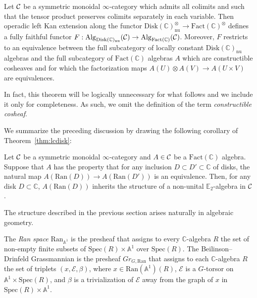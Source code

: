 \begin{thm}
Let $\operatorname{\mathcal{C}}$ be a symmetric monoidal $\infty$-category which admits all colimits and such that the tensor product preserves colimits separately in each variable.  Then operadic left Kan extension along the functor $\mathrm{Disk}(\mathbb{C})_{\mathrm{nu}}^\otimes \to \mathrm{Fact}(\mathbb{C})^\otimes$ defines a fully faithful functor $F: \operatorname{\mathrm{Alg}}_{\mathrm{Disk}(\mathbb{C})_{\mathrm{nu}}}(\operatorname{\mathcal{C}}) \to \operatorname{\mathrm{Alg}}_{\mathrm{Fact}(\mathbb{C})}(\operatorname{\mathcal{C}})$.  Moreover, $F$ restricts to an equivalence between the full subcategory of locally constant $\mathrm{Disk}(\mathbb{C})_{\mathrm{nu}}$ algebras and the full subcategory of $\mathrm{Fact}(\mathbb{C})$ algebras $A$ which are constructible cosheaves and for which the factorization maps $A(U)\otimes A(V) \to A(U\times V)$ are equivalences.  
\end{thm}

\begin{rmk}
In fact, this theorem will be logically unnecessary for what follows and we include it only for completeness.  As such, we omit the definition of the term \emph{constructible cosheaf}.  
\end{rmk}

We summarize the preceding discussion by drawing the following corollary of Theorem~\ref{thm:lcdisk}:
\begin{cor} \label{cor:E2crit}
Let $\operatorname{\mathcal{C}}$ be a symmetric monoidal $\infty$-category and $A \in \operatorname{\mathcal{C}}$ be a $\mathrm{Fact}(\mathbb{C})$ algebra.  Suppose that $A$ has the property that for any inclusion $D\subset D' \subset \mathbb{C}$ of disks, the natural map $A(\mathrm{Ran}(D))\to A(\mathrm{Ran}(D'))$ is an equivalence.  Then, for any disk $D\subset \mathbb{C}$, $A(\mathrm{Ran}(D))$ inherits the structure of a non-unital $\mathbb{E}_2$-algebra in $\operatorname{\mathcal{C}}$.  
\end{cor}


The structure described in the previous section arises naturally in algebraic geometry.  

\begin{dfn}
The \textit{Ran space} $\text{Ran}_{\mathbb{A}^1}$ is the presheaf that assigns to every $\mathbb{C}$-algebra $R$ the set of non-empty finite subsets of $\text{Spec}(R) \times \mathbb{A}^1$ over $\text{Spec}(R)$.   The Beilinson--Drinfeld Grassmannian is the presheaf $Gr_{G,\text{Ran}}$ that assigns to each $\mathbb{C}$-algebra $R$ the set of triplets $(x,\mathcal{E},\beta)$, where $x \in \text{Ran}(\mathbb{A}^1)(R)$, $\mathcal{E}$ is a $G$-torsor on $\mathbb{A}^1 \times \text{Spec}(R)$, and $\beta$ is a trivialization of $\mathcal{E}$ away from the graph of $x$ in $\text{Spec}(R) \times \mathbb{A}^1$.
\end{dfn}

